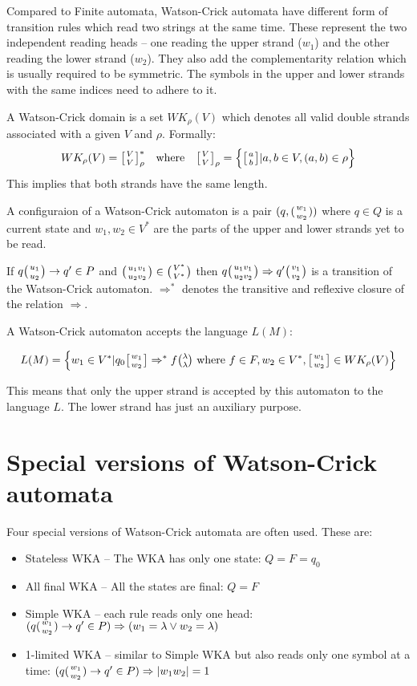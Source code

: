 Compared to Finite automata, Watson-Crick automata have different form of transition rules which read two strings at the same time. These represent the two independent reading heads -- one reading the upper strand ($w_1$) and the other reading the lower strand ($w_2$). They also add the complementarity relation which is usually required to be symmetric. The symbols in the upper and lower strands with the same indices need to adhere to it.

A Watson-Crick domain is a set $WK_{\rho}(V)$ which denotes all valid double strands associated with a given $V$ and $\rho$. Formally:
\begin{align}
	WK_{\rho}(V) = \wkdomain{V}{V}_{\rho}^{*} && \textnormal{where} && \wkdomain{V}{V}_{\rho} = \Big\{\wkdomain{a}{b} | a, b \in V, (a, b) \in \rho \Big\}
\end{align}
This implies that both strands have the same length.

A configuraion of a Watson-Crick automaton is a pair $(q, ({w_1 \atop w_2}))$ where $q \in Q$ is a current state and $w_1, w_2 \in V^*$ are the parts of the upper and lower strands yet to be read.

If $q\big({u_1 \atop u_2}\big) \rightarrow q' \in P$ and $\big({u_1 v_1 \atop u_2 v_2}\big) \in \big({V^* \atop V^*}\big)$ then $q\big({u_1 v_1 \atop u_2 v_2}\big) \Rightarrow q'\big({v_1 \atop v_2}\big)$ is a transition of the Watson-Crick automaton. $\Rightarrow^*$ denotes the transitive and reflexive closure of the relation $\Rightarrow$.

A Watson-Crick automaton accepts the language $L(M)$:

$$L(M) = \Big\{w_1 \in V^* | q_0 \wkdomain{w_1}{w_2} \Rightarrow^* f \genfrac{(}{)}{0pt}{1}{\lambda}{\lambda} \textnormal{ where } f \in F, w_2 \in V^*, \wkdomain{w_1}{w_2} \in WK_{\rho}(V)\Big\}$$

This means that only the upper strand is accepted by this automaton to the language $L$. The lower strand has just an auxiliary purpose.

\section{Special versions of Watson-Crick automata}
Four special versions of Watson-Crick automata are often used. These are:
\begin{itemize}
  \item{Stateless WKA -- The WKA has only one state: $Q = F = {q_0}$}
  \item{All final WKA -- All the states are final: $Q = F$}
  \item{Simple WKA -- each rule reads only one head: $(q({w_1 \atop w_2}) \rightarrow q' \in P) \Rightarrow (w_1 = \lambda \vee w_2 = \lambda)$}
  \item{1-limited WKA -- similar to Simple WKA but also reads only one symbol at a time: $(q({w_1 \atop w_2}) \rightarrow q' \in P) \Rightarrow |w_1 w_2| = 1$}
\end{itemize}

